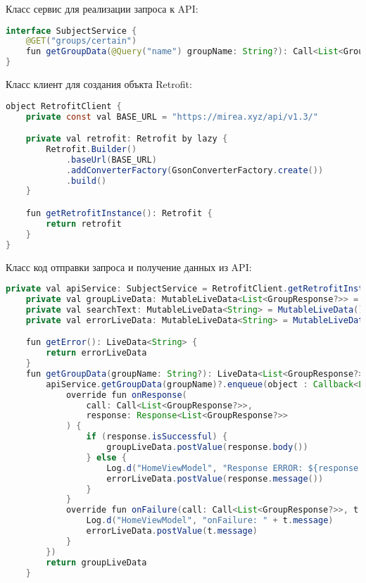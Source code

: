 Класс сервис для реализации запроса к API:
\begin{lstlisting}[language=Java]
interface SubjectService {
    @GET("groups/certain")
    fun getGroupData(@Query("name") groupName: String?): Call<List<GroupResponse?>>?
}
\end{lstlisting}

Класс клиент для создания объкта Retrofit:
\begin{lstlisting}[language=Java]
object RetrofitClient {
    private const val BASE_URL = "https://mirea.xyz/api/v1.3/"

    private val retrofit: Retrofit by lazy {
        Retrofit.Builder()
            .baseUrl(BASE_URL)
            .addConverterFactory(GsonConverterFactory.create())
            .build()
    }

    fun getRetrofitInstance(): Retrofit {
        return retrofit
    }
}
\end{lstlisting}

Класс код отправки запроса и получение данных из API:
\begin{lstlisting}[language=Java]
    private val apiService: SubjectService = RetrofitClient.getRetrofitInstance().create(SubjectService::class.java)
    private val groupLiveData: MutableLiveData<List<GroupResponse?>> = MutableLiveData()
    private val searchText: MutableLiveData<String> = MutableLiveData()
    private val errorLiveData: MutableLiveData<String> = MutableLiveData()

    fun getError(): LiveData<String> {
        return errorLiveData
    }
    fun getGroupData(groupName: String?): LiveData<List<GroupResponse?>> {
        apiService.getGroupData(groupName)?.enqueue(object : Callback<List<GroupResponse?>> {
            override fun onResponse(
                call: Call<List<GroupResponse?>>,
                response: Response<List<GroupResponse?>>
            ) {
                if (response.isSuccessful) {
                    groupLiveData.postValue(response.body())
                } else {
                    Log.d("HomeViewModel", "Response ERROR: ${response.code()} - ${response.message()}")
                    errorLiveData.postValue(response.message())
                }
            }
            override fun onFailure(call: Call<List<GroupResponse?>>, t: Throwable) {
                Log.d("HomeViewModel", "onFailure: " + t.message)
                errorLiveData.postValue(t.message)
            }
        })
        return groupLiveData
    }
\end{lstlisting}

